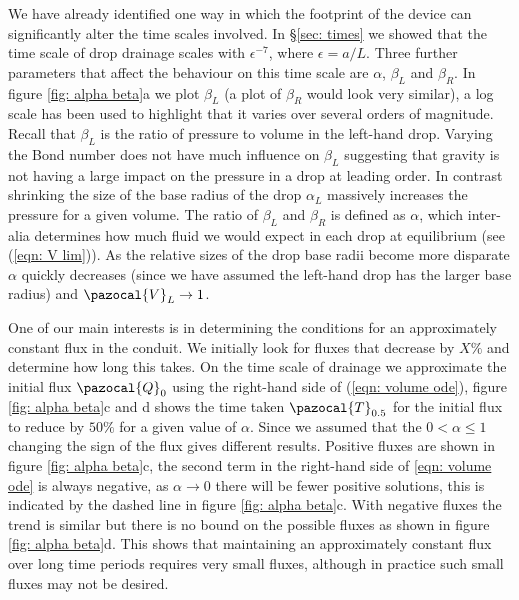\documentclass{jfm}
\begin{document}
We have already identified one way in which the footprint of the device   can significantly alter the  time scales involved.
In \S \ref{sec: times}  we showed that   the time scale of drop drainage scales with $\epsilon^{-7}$, where $\epsilon = a/L$.
Three further parameters that affect the behaviour on this time scale are $\alpha$, $\beta_L$ and $\beta_R$.
In figure \ref{fig: alpha beta}a we plot $\beta_L$ (a plot of $\beta_R$ would look very similar),  a log scale has been used to highlight that it  varies  over several orders of magnitude.
Recall that $\beta_L$ is the ratio of pressure to volume in the left-hand drop.
Varying the Bond number does not have much influence on $\beta_L$ suggesting that gravity is not having a large impact on the pressure in a   drop at leading order.
In contrast shrinking the  size of the base radius of the drop  $\alpha_L$  massively increases the pressure for a given volume.
The ratio of $\beta_L $ and $\beta_R$ is defined as  $\alpha$, which inter-alia  determines     how much fluid we would expect in each drop at equilibrium (see (\ref{eqn: V lim})).
As the relative sizes of the drop base radii become more disparate $\alpha$ quickly decreases (since we have assumed the left-hand drop has the larger base radius) and $\pazocal{V}_L \to 1$. 

One of our main interests is in determining the conditions for an approximately constant  flux in the conduit. 
We  initially look for fluxes that decrease by  $X \%$ and determine how long this takes. 
On the time scale of drainage we approximate the initial flux  $ \pazocal{Q}_0$  using the right-hand side of  (\ref{eqn: volume ode}),  figure \ref{fig: alpha beta}c and d shows   the time taken $\pazocal{T}_{0.5}$ for the   initial flux   to reduce by $50\%$ for a given value of $\alpha$.  
Since we assumed that the $0 <\alpha \leq1$ changing the sign of the flux gives different results.
Positive fluxes are shown in  figure \ref{fig: alpha beta}c, the second term in the right-hand side of \ref{eqn: volume ode} is always negative, as $\alpha \to 0$ there will be fewer  positive solutions, this is indicated by the dashed line in  figure \ref{fig: alpha beta}c. 
With negative fluxes the trend is similar but there is no bound on the possible fluxes as shown in  figure \ref{fig: alpha beta}d.  
This shows that maintaining an approximately constant  flux over long time periods requires  very  small fluxes, although in practice such small fluxes may not be desired.
\end{document}
